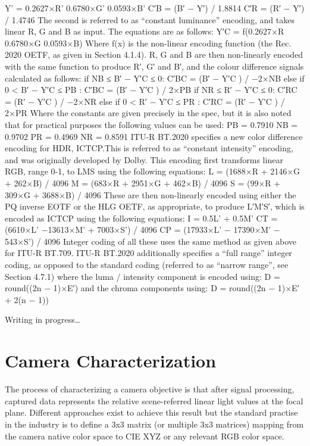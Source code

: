 	Y' = 0.2627×R'  0.6780×G'  0.0593×B'
	C′B = (B′ − Y′) / 1.8814
	C′R = (R′ − Y′) / 1.4746
The second is referred to as “constant luminance” encoding, and takes linear R, G and B as input. The equations are as follows:
	Y′C = f(0.2627×R  0.6780×G  0.0593×B)
Where f(x) is the non-linear encoding function (the Rec. 2020 OETF, as given in Section 4.1.4). R, G and B are then non-linearly encoded with the same function to produce R′, G′ and B′, and the colour difference signals calculated as follows:
	if NB ≤ B′ − Y′C ≤ 0:
C′BC = (B′ − Y′C ) / −2×NB
else if 0 < B′ − Y′C ≤ PB :
	C′BC = (B′ − Y′C ) / 2×PB
	if NR ≤ R′ − Y′C ≤ 0:
C′RC = (R′ − Y′C ) / −2×NR
else if 0 < R′ − Y′C ≤ PR :
	C′RC = (R′ − Y′C ) / 2×PR
Where the constants are given precisely in the spec, but it is also noted that for practical purposes the following values can be used:
	PB = 0.7910
NB = 0.9702
PR = 0.4969
NR = 0.8591
ITU-R BT.2020 specifies a new color difference encoding for HDR,  ICTCP.This is referred to as “constant intensity” encoding, and was originally developed by Dolby. This encoding first transforms linear RGB, range 0-1, to LMS using the following equations:
	L = (1688×R + 2146×G + 262×B) / 4096
M = (683×R + 2951×G + 462×B) / 4096
S = (99×R + 309×G + 3688×B) / 4096
These are then non-linearly encoded using either the PQ inverse EOTF or the HLG OETF, as appropriate, to produce L′M′S′, which is encoded as  ICTCP using the following equations:
	I = 0.5L' + 0.5M'
	CT = (6610×L' −13613×M' + 7003×S') / 4096
CP = (17933×L' − 17390×M' − 543×S') / 4096
Integer coding of all these uses the same method as given above for ITU-R BT.709. ITU-R BT.2020 additionally specifies a “full range” integer coding, as opposed to the standard coding (referred to as “narrow range”, see Section 4.7.1) where the luma / intensity component is encoded using:
	D = round((2n − 1)×E′)
and the chroma components using:
	D = round((2n − 1)×E′ + 2(n − 1))


Writing in progress…

\section{Camera Characterization}

The process of characterizing a camera objective is that after signal processing, captured data represents the relative scene-referred linear light values at the focal plane. Different approaches exist to achieve this result but the standard practise in the industry is to define a 3x3 matrix (or multiple 3x3 matrices) mapping from the camera native color space to CIE XYZ or any relevant RGB color space.


